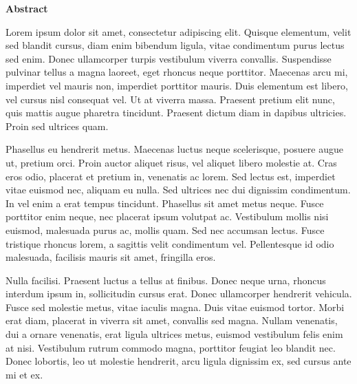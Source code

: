 \thispagestyle{empty}

\begin{center}
\vspace*{4cm}
\textbf{Abstract}
\end{center}

Lorem ipsum dolor sit amet, consectetur adipiscing elit. Quisque elementum, velit sed blandit cursus, diam enim bibendum ligula, vitae condimentum purus lectus sed enim. Donec ullamcorper turpis vestibulum viverra convallis. Suspendisse pulvinar tellus a magna laoreet, eget rhoncus neque porttitor. Maecenas arcu mi, imperdiet vel mauris non, imperdiet porttitor mauris. Duis elementum est libero, vel cursus nisl consequat vel. Ut at viverra massa. Praesent pretium elit nunc, quis mattis augue pharetra tincidunt. Praesent dictum diam in dapibus ultricies. Proin sed ultrices quam.

Phasellus eu hendrerit metus. Maecenas luctus neque scelerisque, posuere augue ut, pretium orci. Proin auctor aliquet risus, vel aliquet libero molestie at. Cras eros odio, placerat et pretium in, venenatis ac lorem. Sed lectus est, imperdiet vitae euismod nec, aliquam eu nulla. Sed ultrices nec dui dignissim condimentum. In vel enim a erat tempus tincidunt. Phasellus sit amet metus neque. Fusce porttitor enim neque, nec placerat ipsum volutpat ac. Vestibulum mollis nisi euismod, malesuada purus ac, mollis quam. Sed nec accumsan lectus. Fusce tristique rhoncus lorem, a sagittis velit condimentum vel. Pellentesque id odio malesuada, facilisis mauris sit amet, fringilla eros.

Nulla facilisi. Praesent luctus a tellus at finibus. Donec neque urna, rhoncus interdum ipsum in, sollicitudin cursus erat. Donec ullamcorper hendrerit vehicula. Fusce sed molestie metus, vitae iaculis magna. Duis vitae euismod tortor. Morbi erat diam, placerat in viverra sit amet, convallis sed magna. Nullam venenatis, dui a ornare venenatis, erat ligula ultrices metus, euismod vestibulum felis enim at nisi. Vestibulum rutrum commodo magna, porttitor feugiat leo blandit nec. Donec lobortis, leo ut molestie hendrerit, arcu ligula dignissim ex, sed cursus ante mi et ex.

\newpage
\blankpage